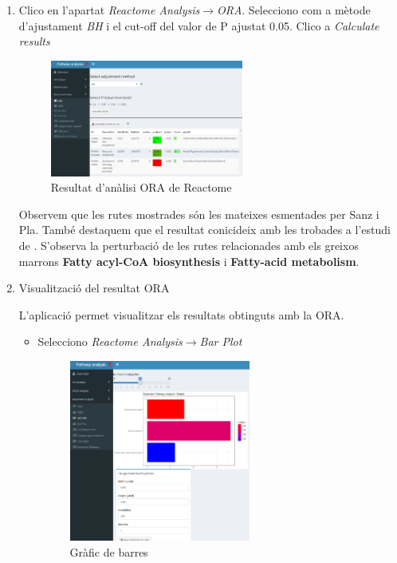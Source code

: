 \begin{enumerate}
\item Clico en l'apartat \textit{Reactome Analysis}$\rightarrow$\textit{ORA}. Selecciono com a mètode d'ajustament \textit{BH} i el cut-off del valor de P ajustat 0.05. Clico a \textit{Calculate results}

\begin{figure}[H]
\centering
\includegraphics[width=0.6\textwidth]{figures/Estudi1_Fig3_ORA_RA.png} 
\caption{Resultat d'anàlisi ORA de Reactome}
\end{figure}

Observem que les rutes mostrades són les mateixes esmentades per Sanz i Pla. També destaquem que el resultat conicideix amb les trobades a l’estudi de \cite{li2017zbtb7b}. S'observa la perturbació de les rutes relacionades amb els greixos marrons \textbf{Fatty acyl-CoA biosynthesis} i \textbf{Fatty-acid metabolism}.

\item Visualització del resultat \gls{ORA}

L'aplicació permet visualitzar els resultats obtinguts amb la \gls{ORA}. 

\begin{itemize}
\item Selecciono \textit{Reactome Analysis}$\rightarrow$\textit{Bar Plot}

\begin{figure}[H]
\centering
\includegraphics[width=0.6\textwidth]{figures/Estudi1_Fig4_ORA_BP_RA.png} 
\caption{Gràfic de barres}
\end{figure}


\end{itemize}
\end{enumerate}
